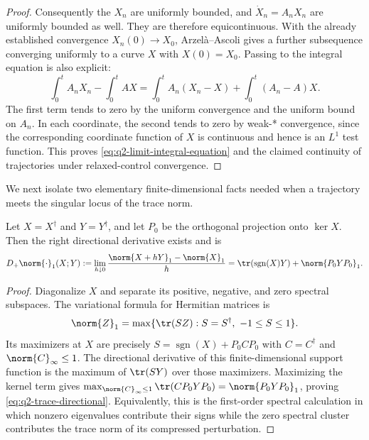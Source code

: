 \documentclass[class=article,11pt,a4paper,crop=false]{standalone}
\begin{document}
\begin{proof}
Consequently the $X_n$ are uniformly bounded, and
$\dot X_n=A_nX_n$ are uniformly bounded as well. They are therefore
equicontinuous. With the already established convergence $X_n(0)\to X_0$,
Arzel\`a--Ascoli gives a further subsequence converging uniformly to a curve
$X$ with $X(0)=X_0$. Passing to the integral equation is also explicit:
\begin{equation}
 \int_0^t A_nX_n-\int_0^t AX
 =\int_0^t A_n(X_n-X)+\int_0^t(A_n-A)X.
\end{equation}
The first term tends to zero by the uniform convergence and the uniform bound
on $A_n$. In each coordinate, the second tends to zero by weak-* convergence,
since the corresponding coordinate function of $X$ is continuous and hence
is an $L^1$ test function. This proves
\eqref{eq:q2-limit-integral-equation} and the claimed continuity of
trajectories under relaxed-control convergence.
\end{proof}

We next isolate two elementary finite-dimensional facts needed when a
trajectory meets the singular locus of the trace norm.

\begin{lemma}
\label{lem:q2-trace-directional}
Let $X=X^\dagger$ and $Y=Y^\dagger$, and let $P_0$ be the orthogonal projection
onto $\ker X$. Then the right directional derivative exists and is
\begin{equation}
 D_+\norm{\cdot}_1(X;Y)
 :=\lim_{h\downarrow0}\frac{\norm{X+hY}_1-\norm{X}_1}{h}
 =\tr(\operatorname{sgn}(X)Y)+\norm{P_0YP_0}_1.
 \label{eq:q2-trace-directional}
\end{equation}
\end{lemma}

\begin{proof}
Diagonalize $X$ and separate its positive, negative, and zero spectral
subspaces. The variational formula for Hermitian matrices is
\begin{equation}
 \norm{Z}_1=\max\{\tr(SZ):S=S^\dagger,\ -1\le S\le1\}.
\end{equation}
Its maximizers at $X$ are precisely
$S=\operatorname{sgn}(X)+P_0CP_0$ with $C=C^\dagger$ and
$\norm{C}_\infty\le1$. The directional derivative of this finite-dimensional
support function is the maximum of $\tr(SY)$ over those maximizers. Maximizing
the kernel term gives
$\max_{\norm{C}_\infty\le1}\tr(CP_0YP_0)=\norm{P_0YP_0}_1$, proving
\eqref{eq:q2-trace-directional}. Equivalently, this is the first-order spectral
calculation in which nonzero eigenvalues contribute their signs while the
zero spectral cluster contributes the trace norm of its compressed
perturbation.
\end{proof}
\end{document}
